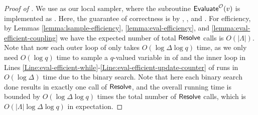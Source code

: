 \begin{proof}[Proof of ]
    We use  as our local sampler, where the subroutine $\textnormal{\textsf{Evaluate}}^{\mathcal{O}}(v)$ is implemented as . Here, the guarantee of correctness is by , , and .
    For efficiency, by Lemmas \ref{lemma:lsample-efficiency}, \ref{lemma:eval-efficiency},  and \ref{lemma:eval-efficient-coupling} we have the expected number of total $\textnormal{\textsf{Resolve}}$ calls is $O(|\Lambda|)$. Note that now each outer loop of  only takes $O(\log \Delta\log q)$ time, as we only need $O(\log q)$ time to sample a $q$-valued variable in  of  and the inner loop in Lines \ref{Line:eval-efficient-while}-\ref{Line:eval-efficient-update-counter} of  runs in $O(\log \Delta)$ time due to the binary search. Note that here each binary search done results in exactly one call of $\textnormal{\textsf{Resolve}}$, and the overall running time is bounded by $O(\log \Delta\log q)$ times the total number of $\textnormal{\textsf{Resolve}}$  calls, which is $O(|\Lambda|\log \Delta\log q)$ in expectation.
\end{proof}
